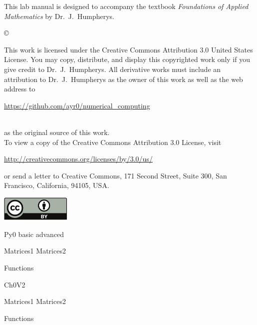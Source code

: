\documentclass{newsiambook}
\begin{document}
\begin{thepreface}
This lab manual is designed to accompany the textbook \emph{Foundations of Applied Mathematics} by Dr.~J.~Humpherys.

\vfill
\copyright{This work is licensed under the Creative Commons Attribution 3.0 United States 
License.  You may copy, distribute, and display this copyrighted work only if you give 
credit to Dr.~J.~Humpherys. All derivative works must include an attribution to Dr.~J.~Humpherys as the owner of this work as well as the web address to 
\\\centerline{\url{https://github.com/ayr0/numerical_computing}}\\ as the original source of 
this 
work.\\To view a copy of the Creative Commons Attribution 3.0 License, 
visit\\\centerline{\url{http://creativecommons.org/licenses/by/3.0/us/}} or send a letter to 
Creative Commons, 171 Second Street, Suite 300, San Francisco, California, 94105, USA.}

\vfill
\centering\includegraphics[height=1.2cm]{by}
\vfill
\end{thepreface}

\setcounter{tocdepth}{1}
\tableofcontents

\mainmatter


\begin{python}
{Py0}
{basic}
{advanced}

{Matrices1}
{Matrices2}

{Functions}
\end{python}

\begin{matlab}
{Ch0V2}

{Matrices1}
{Matrices2}

{Functions}
\end{matlab}
\end{document}
